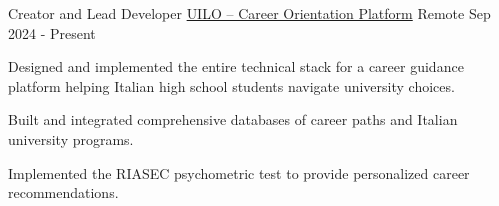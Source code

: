 
\newcommand\gitscale{0.015}
\newcommand\bpscale{0.028}

\begin{cventries}


\cventry
  {Creator and Lead Developer} %
  {\href{https://www.uilo.it}{UILO -- Career Orientation Platform}} 
  {Remote} %
  {Sep 2024 - Present} %
  {
    \begin{cvitems} %
      \item {Designed and implemented the entire technical stack for a career guidance platform helping Italian high school students navigate university choices. }
      \item {Built and integrated comprehensive databases of career paths and Italian university programs.}
      \item {Implemented the RIASEC psychometric test to provide personalized career recommendations.}
    \end{cvitems}
  }



\end{cventries}
